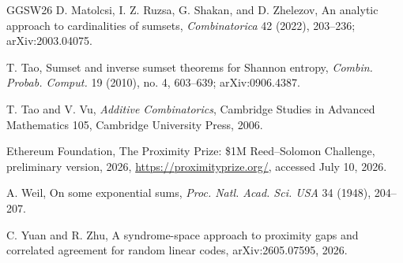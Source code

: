 \documentclass[12pt,a4paper]{amsart}
\numberwithin{equation}{section}
\theoremstyle{remark}
\begin{document}
\begin{thebibliography}{GGSW26}
D. Matolcsi, I. Z. Ruzsa, G. Shakan, and D. Zhelezov,
\newblock An analytic approach to cardinalities of sumsets,
\newblock \emph{Combinatorica} 42 (2022), 203--236; arXiv:2003.04075.

T. Tao,
\newblock Sumset and inverse sumset theorems for Shannon entropy,
\newblock \emph{Combin. Probab. Comput.} 19 (2010), no. 4, 603--639; arXiv:0906.4387.

T. Tao and V. Vu,
\newblock \emph{Additive Combinatorics},
\newblock Cambridge Studies in Advanced Mathematics 105, Cambridge University Press, 2006.

{Ethereum Foundation},
\newblock The Proximity Prize: \$1M Reed--Solomon Challenge,
\newblock preliminary version, 2026,
\newblock \url{https://proximityprize.org/}, accessed July 10, 2026.

A. Weil,
\newblock On some exponential sums,
\newblock \emph{Proc. Natl. Acad. Sci. USA} 34 (1948), 204--207.

C. Yuan and R. Zhu,
\newblock A syndrome-space approach to proximity gaps and correlated
agreement for random linear codes,
\newblock arXiv:2605.07595, 2026.

\end{thebibliography}
\end{document}
